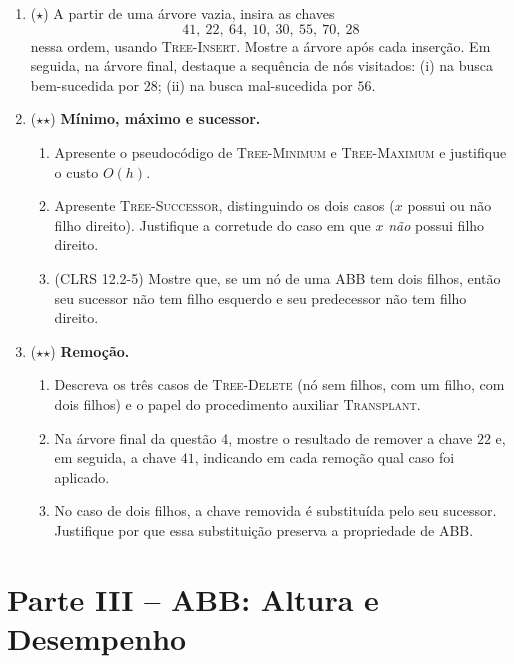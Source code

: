 \documentclass[10pt,a4paper]{extarticle}
\newcommand{\impt}[1]{\textcolor{important}{#1}}
\newcommand{\ntc}[1]{\textcolor{notice}{#1}}
\begin{document}
\begin{enumerate}[label=\textbf{\arabic*.}, leftmargin=*, start=4]

\item \ntc{($\star$)} A partir de uma árvore vazia, insira as chaves
\[
41,\ 22,\ 64,\ 10,\ 30,\ 55,\ 70,\ 28
\]
nessa ordem, usando \textsc{Tree-Insert}. Mostre a árvore \impt{após cada inserção}. Em seguida, na árvore final, destaque a sequência de nós visitados: (i) na busca bem-sucedida por $28$; (ii) na busca mal-sucedida por $56$.

\item \ntc{($\star$$\star$)} \textbf{Mínimo, máximo e sucessor.}
  \begin{enumerate}[label=(\alph*)]
    \item Apresente o pseudocódigo de \textsc{Tree-Minimum} e \textsc{Tree-Maximum} e justifique o custo $O(h)$.
    \item Apresente \textsc{Tree-Successor}, distinguindo os dois casos ($x$ possui ou não filho direito). Justifique a corretude do caso em que $x$ \emph{não} possui filho direito.
    \item (CLRS 12.2-5) Mostre que, se um nó de uma ABB tem dois filhos, então seu sucessor não tem filho esquerdo e seu predecessor não tem filho direito.
  \end{enumerate}

\item \ntc{($\star$$\star$)} \textbf{Remoção.}
  \begin{enumerate}[label=(\alph*)]
    \item Descreva os três casos de \textsc{Tree-Delete} (nó sem filhos, com um filho, com dois filhos) e o papel do procedimento auxiliar \textsc{Transplant}.
    \item Na árvore final da questão 4, mostre o resultado de remover a chave $22$ e, em seguida, a chave $41$, indicando em cada remoção qual caso foi aplicado.
    \item No caso de dois filhos, a chave removida é substituída pelo seu \impt{sucessor}. Justifique por que essa substituição preserva a propriedade de ABB.
  \end{enumerate}

\end{enumerate}

\section*{Parte III -- ABB: Altura e Desempenho}
\end{document}
